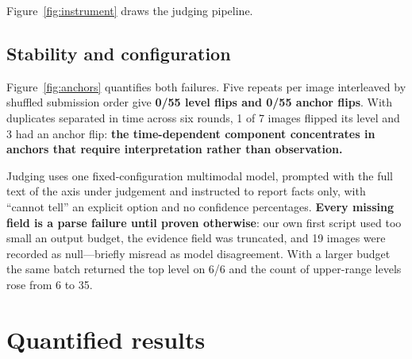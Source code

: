 \documentclass[11pt]{article}
\begin{document}
Figure~\ref{fig:instrument} draws the judging pipeline. \subsection{Stability and configuration}

Figure~\ref{fig:anchors} quantifies both failures. Five repeats per image interleaved by shuffled submission order give
\textbf{0/55 level flips and 0/55 anchor flips}. With duplicates separated in
time across six rounds, 1 of 7 images flipped its level and 3 had an anchor
flip: \textbf{the time-dependent component concentrates in anchors that require
interpretation rather than observation.}

Judging uses one fixed-configuration multimodal model, prompted with the full
text of the axis under judgement and instructed to report facts only, with
``cannot tell'' an explicit option and no confidence percentages. \textbf{Every
missing field is a parse failure until proven otherwise}: our own first script
used too small an output budget, the evidence field was truncated, and 19
images were recorded as null---briefly misread as model disagreement. With a
larger budget the same batch returned the top level on 6/6 and the count of
upper-range levels rose from 6 to 35.

\section{Quantified results}
\label{sec:quant}
\end{document}
